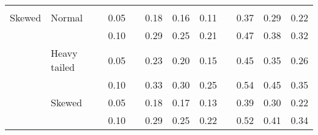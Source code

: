 \begin{table}[ht]
\begin{scriptsize}
\begin{tabular}{ll p{.1cm} c p{.1cm} rrr p{.1cm} rrr}
             &&&&&&&&&&&\\
Skewed       & Normal       && 0.05 &&  0.18 & 0.16 & 0.11 && 0.37 & 0.29 & 0.22 \\ 
             &              && 0.10 &&  0.29 & 0.25 & 0.21 && 0.47 & 0.38 & 0.32 \\ 
             & Heavy tailed && 0.05 &&  0.23 & 0.20 & 0.15 && 0.45 & 0.35 & 0.26 \\ 
             &              && 0.10 &&  0.33 & 0.30 & 0.25 && 0.54 & 0.45 & 0.35 \\ 
             & Skewed       && 0.05 &&  0.18 & 0.17 & 0.13 && 0.39 & 0.30 & 0.22 \\ 
             &              && 0.10 &&  0.29 & 0.25 & 0.22 && 0.52 & 0.41 & 0.34 \\ 


\hline
\end{tabular}
\end{scriptsize}
\end{table}

